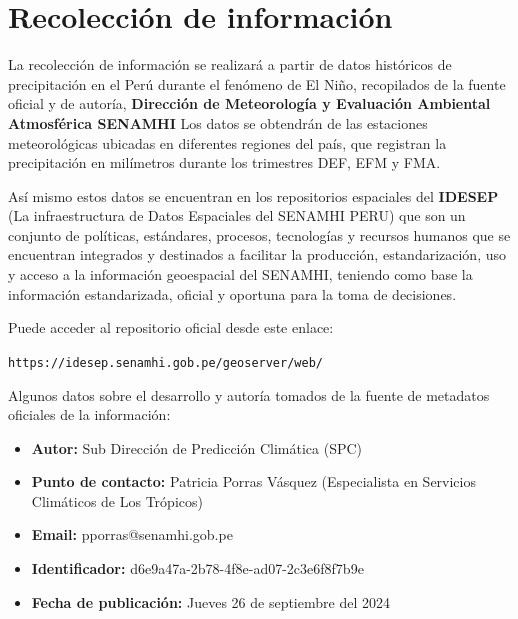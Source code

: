 \documentclass{article}
\begin{document}
\newpage

\section{Recolección de información}

La recolección de información se realizará a partir de datos históricos de precipitación en el Perú durante el fenómeno de El Niño, recopilados de la fuente oficial y de autoría, \textbf{Dirección de Meteorología y Evaluación Ambiental Atmosférica SENAMHI} Los datos se obtendrán de las estaciones meteorológicas ubicadas en diferentes regiones del país, que registran la precipitación en milímetros durante los trimestres DEF, EFM y FMA.

Así mismo estos datos se encuentran en los repositorios espaciales del \textbf{IDESEP} (La infraestructura de Datos Espaciales del SENAMHI PERU) que son un conjunto de políticas, estándares, procesos, tecnologías y recursos humanos que se encuentran integrados y destinados a facilitar la producción, estandarización, uso y acceso a la información geoespacial del SENAMHI, teniendo como base la información estandarizada, oficial y oportuna para la toma de decisiones.

Puede acceder al repositorio oficial desde este enlace:

\texttt{https://idesep.senamhi.gob.pe/geoserver/web/}

Algunos datos sobre el desarrollo y autoría tomados de la fuente de metadatos oficiales de la información:

\begin{itemize}
  \item \textbf{Autor:} Sub Dirección de Predicción Climática (SPC)
  \item \textbf{Punto de contacto:} Patricia Porras Vásquez (Especialista en Servicios Climáticos de Los Trópicos)
  \item \textbf{Email:} pporras@senamhi.gob.pe
  \item \textbf{Identificador:} d6e9a47a-2b78-4f8e-ad07-2c3e6f8f7b9e
  \item \textbf{Fecha de publicación:} Jueves 26 de septiembre del 2024
\end{itemize}
\end{document}
